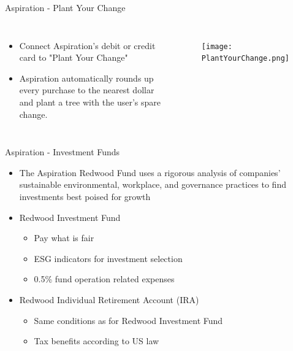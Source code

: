 \documentclass{beamer}
\begin{document}
\begin{frame}{Aspiration - Plant Your Change }
\begin{columns}
 
\begin{itemize}
    
\item Connect Aspiration's  debit or credit card to "Plant Your Change"
\item Aspiration automatically rounds up every purchase to the nearest dollar and plant a tree with the user's spare change.
\end{itemize}

\begin{figure}[ht]
\begin{right}
\texttt{[image: PlantYourChange.png]}

\end{right}
\end{figure}
\end{columns}

\end{frame}






\begin{frame}{Aspiration - Investment Funds}
\begin{itemize}
\item The Aspiration Redwood Fund uses a rigorous analysis of companies’ sustainable environmental, workplace, and governance practices to find investments best poised for growth
       
        
\item  Redwood Investment Fund
\begin{itemize}
        \item Pay what is fair
        \item ESG indicators for investment selection
        \item 0.5\% fund operation related expenses
        \end{itemize}
        
        
\item  Redwood Individual Retirement Account (IRA)
\begin{itemize}
        \item Same conditions as for Redwood Investment Fund 
        \item Tax benefits according to US law
        \end{itemize}


\end{itemize}
\end{frame}
\end{document}
